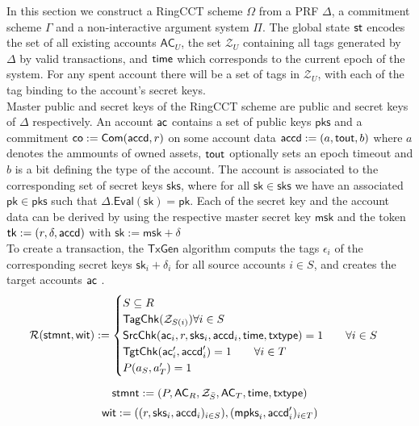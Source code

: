 In this section we construct a RingCCT scheme $\Omega$ from a PRF $\Delta$, a commitment scheme $\Gamma$ and a non-interactive argument system $\Pi$. The global state $\st$ encodes the set of all existing accounts $\mathsf{AC}_U$, the set $\mathcal{Z}_U$ containing all tags generated by $\Delta$ by valid transactions, and $\mathsf{time}$ which corresponds to the current epoch of the system. For any spent account there will be a set of tags in $\mathcal{Z}_U$, with each of the tag binding to the account's secret keys. \\
Master public and secret keys of the RingCCT scheme are public and secret keys of $\Delta$ respectively. An account $\mathsf{ac}$ contains a set of public keys $\mathsf{pks}$ and a commitment $\mathsf{co} := \mathsf{Com}(\mathsf{accd}, r)$ on some account data $\mathsf{accd} := (a, \mathsf{tout}, b)$ where $a$ denotes the ammounts of owned assets, $\mathsf{tout}$ optionally sets an epoch timeout and $b$ is a bit defining the type of the account. The account is associated to the corresponding set of secret keys $\mathsf{sks}$, where for all $\mathsf{sk} \in \mathsf{sks}$ we have an associated $\mathsf{pk} \in \mathsf{pks}$ such that $\Delta.\mathsf{Eval}(\mathsf{sk}) = \mathsf{pk}$. Each of the secret key and the account data can be derived by using the respective master secret key $\mathsf{msk}$ and the token $\mathsf{tk} := (r, \delta, \mathsf{accd})$ with $\mathsf{sk} := \mathsf{msk} + \delta$ \\ 
To create a transaction, the $\mathsf{TxGen}$ algorithm computs the tags $\epsilon_i$ of the corresponding secret keys $\mathsf{sk}_i + \delta_i$ for all source accounts $i \in S$, and creates the target accounts $\mathsf{ac}$ .
\begin{equation*}
\mathcal{R}(\mathsf{stmnt}, \mathsf{wit}) := \begin{cases} 
    S \subseteq R \\ 
    \mathsf{TagChk}(\mathcal{Z}_{S(i)}) \forall i \in S \\
    \mathsf{SrcChk}(\mathsf{ac}_i, r, \mathsf{sks}_i, \mathsf{accd}_i, \mathsf{time}, \mathsf{txtype}) = 1 \qquad \forall i \in S \\ 
    \mathsf{TgtChk}(\mathsf{ac}'_i, \mathsf{accd}'_i) = 1 \qquad \forall i \in T \\ 
    P(a_S, a'_T) = 1
\end{cases}
\end{equation*}

\begin{equation*}
\mathsf{stmnt} := (P,\mathsf{AC}_R,\mathcal{Z}_{\bar{S}}, \mathsf{AC}_T, \mathsf{time}, \mathsf{txtype}) \\
\end{equation*}
\begin{equation*}
\mathsf{wit} := ((r,\mathsf{sks}_i, \mathsf{accd}_i)_{i\in S}), (\mathsf{mpks}_i, \mathsf{accd}'_i)_{i\in T}) \\
\end{equation*}

